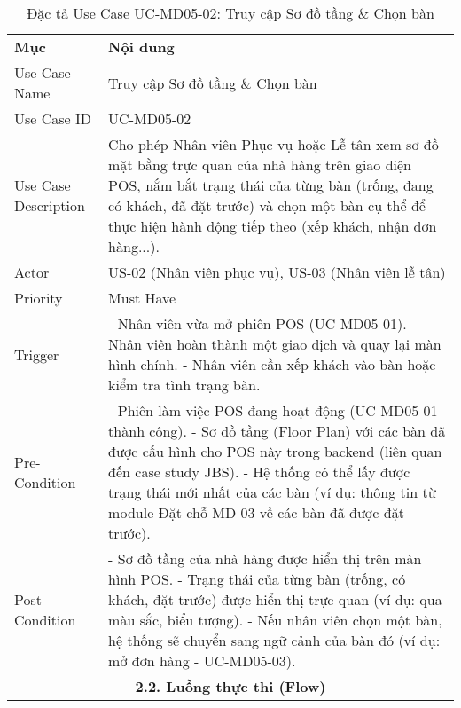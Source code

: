 \begin{longtable}{|m{4cm}|p{11cm}|}
\caption{Đặc tả Use Case UC-MD05-02: Truy cập Sơ đồ tầng \& Chọn bàn} \label{tab:uc_md05_02} \\
\hline

\endhead %
\hline
\endfoot %
\hline
\endlastfoot %
\multicolumn{2}{|c|}{\textbf{2.1. Tóm tắt (Summary)}} \\
\hline
\textbf{Mục} & \textbf{Nội dung} \\
\hline
Use Case Name & Truy cập Sơ đồ tầng \& Chọn bàn \\
\hline
Use Case ID & UC-MD05-02 \\
\hline
Use Case Description & Cho phép Nhân viên Phục vụ hoặc Lễ tân xem sơ đồ mặt bằng trực quan của nhà hàng trên giao diện POS, nắm bắt trạng thái của từng bàn (trống, đang có khách, đã đặt trước) và chọn một bàn cụ thể để thực hiện hành động tiếp theo (xếp khách, nhận đơn hàng...). \\
\hline
Actor & US-02 (Nhân viên phục vụ), US-03 (Nhân viên lễ tân) \\
\hline
Priority & Must Have \\
\hline
Trigger & - Nhân viên vừa mở phiên POS (UC-MD05-01). \newline - Nhân viên hoàn thành một giao dịch và quay lại màn hình chính. \newline - Nhân viên cần xếp khách vào bàn hoặc kiểm tra tình trạng bàn. \\
\hline
Pre-Condition & - Phiên làm việc POS đang hoạt động (UC-MD05-01 thành công). \newline - Sơ đồ tầng (Floor Plan) với các bàn đã được cấu hình cho POS này trong backend (liên quan đến case study JBS). \newline - Hệ thống có thể lấy được trạng thái mới nhất của các bàn (ví dụ: thông tin từ module Đặt chỗ MD-03 về các bàn đã được đặt trước). \\
\hline
Post-Condition & - Sơ đồ tầng của nhà hàng được hiển thị trên màn hình POS. \newline - Trạng thái của từng bàn (trống, có khách, đặt trước) được hiển thị trực quan (ví dụ: qua màu sắc, biểu tượng). \newline - Nếu nhân viên chọn một bàn, hệ thống sẽ chuyển sang ngữ cảnh của bàn đó (ví dụ: mở đơn hàng - UC-MD05-03). \\
\hline
\multicolumn{2}{|c|}{\textbf{2.2. Luồng thực thi (Flow)}} \\

\end{longtable}

